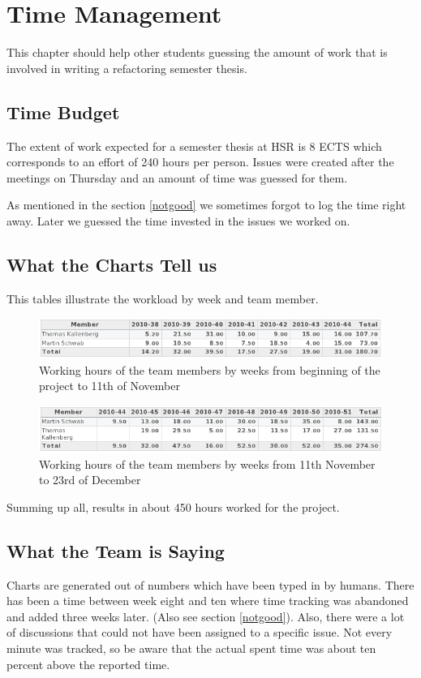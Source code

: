 \chapter{Time Management}
\thispagestyle{fancy}
This chapter should help other students guessing the amount of work that is 
involved in writing a refactoring semester thesis.

\section{Time Budget}
The extent of work expected for a semester thesis at HSR is 8 ECTS which 
corresponds to an effort of 240 hours per person. Issues were created after 
the meetings on Thursday and an amount of time was guessed for them.

As mentioned in the section \ref{notgood} we sometimes forgot to log the time
right away. Later we guessed the time invested in the issues we worked on.

\section{What the Charts Tell us}
This tables illustrate the workload by week and team member.

\begin{figure}[h]
\includegraphics[width=1\textwidth]{images/timetable1.png}
\caption{Working hours of the team members by weeks from beginning of the
project to 11th of November}
\label{timetable1}
\end{figure}

\begin{figure}[h]
\includegraphics[width=1\textwidth]{images/timetable2.png}
\caption{Working hours of the team members by weeks from 11th November to 23rd
of December}
\label{timetable2}
\end{figure}

Summing up all, results in about 450 hours worked for the project.

\section{What the Team is Saying}
Charts are generated out of numbers which have been typed in by humans. There 
has been a time between week eight and ten where time tracking was abandoned and 
added three weeks later. (Also see section \ref{notgood}). Also, there were a
lot of discussions that could not have been assigned to a specific issue. Not
every minute was tracked, so be aware that the actual spent time was about ten
percent above the reported time.
